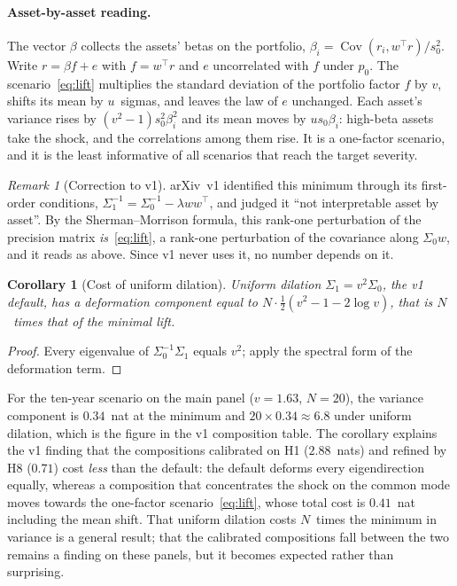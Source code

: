 \documentclass[11pt]{article}
\newtheorem{corollary}{Corollary}
\theoremstyle{definition}
\theoremstyle{remark}
\newtheorem*{remark}{Remark}
\begin{document}
\paragraph{Asset-by-asset reading.} The vector $\beta$ collects the assets'
betas on the portfolio, $\beta_i=\operatorname{Cov}(r_i,w^\top r)/s_0^2$. Write
$r=\beta f+e$ with $f=w^\top r$ and $e$ uncorrelated with $f$ under $p_0$. The
scenario~\eqref{eq:lift} multiplies the standard deviation of the portfolio
factor $f$ by $v$, shifts its mean by $u$~sigmas, and leaves the law of $e$
unchanged. Each asset's variance rises by $(v^2-1)s_0^2\beta_i^2$ and its mean
moves by $us_0\beta_i$: high-beta assets take the shock, and the correlations
among them rise. It is a one-factor scenario, and it is the least informative of
all scenarios that reach the target severity.

\begin{remark}[Correction to v1]
arXiv~v1 identified this minimum through its first-order conditions,
$\Sigma_1^{-1}=\Sigma_0^{-1}-\lambda ww^\top$, and judged it ``not interpretable
asset by asset''. By the Sherman--Morrison formula, this rank-one perturbation of
the precision matrix \emph{is}~\eqref{eq:lift}, a rank-one perturbation of the
covariance along $\Sigma_0w$, and it reads as above. Since v1 never uses it, no
number depends on it.
\end{remark}

\begin{corollary}[Cost of uniform dilation]
\label{cor:uniform}
Uniform dilation $\Sigma_1=v^2\Sigma_0$, the v1 default, has a deformation
component equal to $N\cdot\tfrac12(v^2-1-2\log v)$, that is $N$~times that of the
minimal lift.
\end{corollary}

\begin{proof}
Every eigenvalue of $\Sigma_0^{-1}\Sigma_1$ equals $v^2$; apply the spectral form
of the deformation term.
\end{proof}

For the ten-year scenario on the main panel ($v=1.63$, $N=20$), the variance
component is $0.34$~nat at the minimum and $20\times0.34\approx6.8$ under uniform
dilation, which is the figure in the v1 composition table. The corollary
explains the v1 finding that the compositions calibrated on H1 ($2.88$~nats) and
refined by H8 ($0.71$) cost \emph{less} than the default: the default deforms
every eigendirection equally, whereas a composition that concentrates the shock
on the common mode moves towards the one-factor scenario~\eqref{eq:lift}, whose
total cost is $0.41$~nat including the mean shift. That uniform dilation costs
$N$~times the minimum in variance is a general result; that the calibrated
compositions fall between the two remains a finding on these panels, but it
becomes expected rather than surprising.
\end{document}
